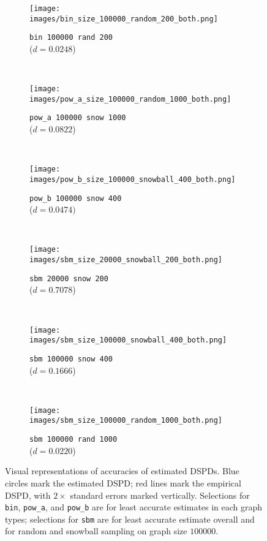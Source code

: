 \begin{figure}[hbtp]
    \centering
    \begin{subfigure}[t]{.45\linewidth}
        \centering
        \texttt{[image: images/bin\_size\_100000\_random\_200\_both.png]}
        \caption{\texttt{bin 100000 rand 200}\\($d=0.0248$)}
        \label{fig:accuracy_bin}
    \end{subfigure}
    ~
    \begin{subfigure}[t]{.45\linewidth}
        \centering
        \texttt{[image: images/pow\_a\_size\_100000\_random\_1000\_both.png]}
        \caption{\texttt{pow\_a 100000 snow 1000}\\($d=0.0822$)}
        \label{fig:accuracy_pow_a}
    \end{subfigure}
    \\
    \begin{subfigure}[t]{.45\linewidth}
        \centering
        \texttt{[image: images/pow\_b\_size\_100000\_snowball\_400\_both.png]}
        \caption{\texttt{pow\_b 100000 snow 400}\\($d=0.0474)$}
        \label{fig:accuracy_pow_b}
    \end{subfigure}
    ~
    \begin{subfigure}[t]{.45\linewidth}
        \centering
        \texttt{[image: images/sbm\_size\_20000\_snowball\_200\_both.png]}
        \caption{\texttt{sbm 20000 snow 200}\\($d=0.7078$)}
        \label{fig:accuracy_sbm_1}
    \end{subfigure}
    \\
    \begin{subfigure}[t]{.45\linewidth}
        \centering
        \texttt{[image: images/sbm\_size\_100000\_snowball\_400\_both.png]}
        \caption{\texttt{sbm 100000 snow 400}\\($d=0.1666$)}
        \label{fig:accuracy_sbm_2}
    \end{subfigure}
    ~
    \begin{subfigure}[t]{.45\linewidth}
        \centering
        \texttt{[image: images/sbm\_size\_100000\_random\_1000\_both.png]}
        \caption{\texttt{sbm 100000 rand 1000}\\($d=0.0220$)}
        \label{fig:accuracy_sbm_3}
    \end{subfigure}
    \caption{Visual representations of accuracies of estimated DSPDs. Blue circles mark the estimated DSPD; red lines mark the empirical DSPD, with $2\times$ standard errors marked vertically. Selections for \texttt{bin}, \texttt{pow\_a}, and \texttt{pow\_b} are for least accurate estimates in each graph types; selections for \texttt{sbm} are for least accurate estimate overall and for random and snowball sampling on graph size $100000$.}

\end{figure}
